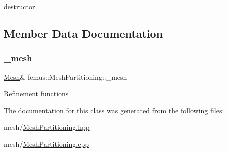destructor 

\subsection{Member Data Documentation}
\mbox{\label{classfemus_1_1_mesh_partitioning_ac7a47c3281981a8c39a1cd9751b07955}} 
\subsubsection{\texorpdfstring{\+\_\+mesh}{\_mesh}}
{\footnotesize\ttfamily \mbox{\hyperlink{classfemus_1_1_mesh}{Mesh}}\& femus\+::\+Mesh\+Partitioning\+::\+\_\+mesh\hspace{0.3cm}{\ttfamily [protected]}}

Refinement functions 

The documentation for this class was generated from the following files\+:\begin{DoxyCompactItemize}
\item 
mesh/\mbox{\hyperlink{_mesh_partitioning_8hpp}{Mesh\+Partitioning.\+hpp}}\item 
mesh/\mbox{\hyperlink{_mesh_partitioning_8cpp}{Mesh\+Partitioning.\+cpp}}\end{DoxyCompactItemize}
